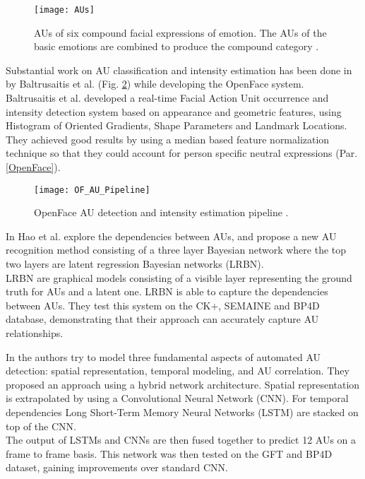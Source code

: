 \begin{figure}[H]
	\centering
	\texttt{[image: AUs]}
	\caption{AUs of six compound facial expressions of emotion. The AUs of the basic emotions are combined to produce the compound category \cite{Du2014CompoundFE}.}
	\label{fig:AUs}
\end{figure}

Substantial work on AU classification and intensity estimation has been done in \cite{Baltru2015} by Baltrusaitis et al. (Fig. \ref{fig:OF_AU_pipeline}) while developing the OpenFace \cite{Baltru2016} system. \\
Baltrusaitis et al. developed a real-time Facial Action Unit occurrence and intensity detection system based on appearance and geometric features, using Histogram of Oriented Gradients, Shape Parameters and Landmark Locations. They achieved good results by using a median based feature normalization technique so that they could account for person specific neutral expressions (Par. \ref{OpenFace}).

\begin{figure}[H]
	\centering
	\texttt{[image: OF\_AU\_Pipeline]}
	\caption{OpenFace AU detection and intensity estimation pipeline \cite{Baltru2015}.}
	\label{fig:OF_AU_pipeline}
\end{figure}

In \cite{HaoWangAU} Hao et al. explore the dependencies between AUs, and propose a new AU recognition method consisting of a three layer Bayesian network where the top two layers are latent regression Bayesian networks (LRBN). \\
LRBN are graphical models consisting of a visible layer representing the ground truth for AUs and a latent one. LRBN is able to capture the dependencies between AUs. They test this system on the CK+, SEMAINE and BP4D database, demonstrating that their approach can accurately capture AU relationships.

In \cite{AU_LSTM} the authors try to model three fundamental aspects of automated AU detection: spatial representation, temporal modeling, and AU correlation. They proposed an approach using a hybrid network architecture. Spatial representation is extrapolated by using a Convolutional Neural Network (CNN). For temporal dependencies Long Short-Term Memory Neural Networks (LSTM) are stacked on top of the CNN. \\
The output of LSTMs and CNNs are then fused together to predict 12 AUs on a frame to frame basis. This network was then tested on the GFT and BP4D dataset, gaining improvements over standard CNN.

